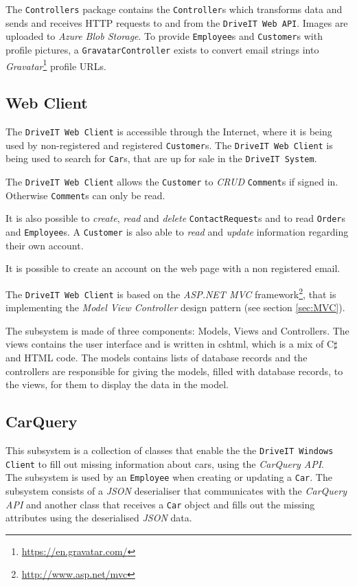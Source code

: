 The \texttt{Controllers} package contains the \texttt{Controller}s which transforms data and sends and receives HTTP requests to and from the \texttt{DriveIT Web API}. Images are uploaded to \textit{Azure Blob Storage}. To provide \texttt{Employee}s and \texttt{Customer}s with profile pictures, a \texttt{GravatarController} exists to convert email strings into \textit{Gravatar}\footnote{\url{https://en.gravatar.com/}} profile URLs.

\subsection{Web Client}
The \texttt{DriveIT Web Client} is accessible through the Internet, where it is being used by non-registered and registered \texttt{Customer}s. The \texttt{DriveIT Web Client} is being used to search for \texttt{Car}s, that are up for sale in the \texttt{DriveIT System}.

The \texttt{DriveIT Web Client} allows the \texttt{Customer} to \textit{CRUD} \texttt{Comment}s if signed in. Otherwise \texttt{Comment}s can only be read.

It is also possible to \textit{create}, \textit{read} and \textit{delete} \texttt{ContactRequest}s and to read \texttt{Order}s and \texttt{Employee}s. A \texttt{Customer} is also able to \textit{read} and \textit{update} information regarding their own account.

It is possible to create an account on the web page with a non registered email.

The \texttt{DriveIT Web Client} is based on the \textit{ASP.NET MVC} framework\footnote{\url{http://www.asp.net/mvc}}, that is implementing the \textit{Model View Controller} design pattern (see section \ref{sec:MVC}).

The subsystem is made of three components: Models, Views and Controllers. The views contains the user interface and is written in cshtml, which is a mix of C$\sharp$ and HTML code. The models contains lists of database records and the controllers are responsible for giving the models, filled with database records, to the views, for them to display the data in the model.

\subsection{CarQuery} 
This subsystem is a collection of classes that enable the the \texttt{DriveIT Windows Client} to fill out missing information about cars, using the \textit{CarQuery API}.\\
The subsystem is used by an \texttt{Employee} when creating or updating a \texttt{Car}. The subsystem consists of a \textit{JSON} deserialiser that communicates with the \textit{CarQuery API} and another class that receives a \texttt{Car} object and fills out the missing attributes using the deserialised \textit{JSON} data.

